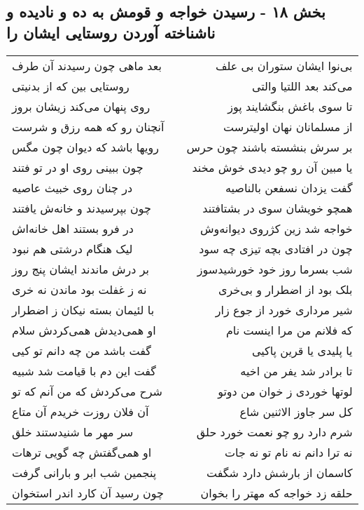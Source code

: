 \begin{center}
\section*{بخش ۱۸ - رسیدن خواجه و قومش به ده و نادیده و ناشناخته آوردن روستایی ایشان را}
\label{sec:sh018}
\begin{longtable}{l p{0.5cm} r}
بعد ماهی چون رسیدند آن طرف
&&
بی‌نوا ایشان ستوران بی علف
\\
روستایی بین که از بدنیتی
&&
می‌کند بعد اللتیا والتی
\\
روی پنهان می‌کند زیشان بروز
&&
تا سوی باغش بنگشایند پوز
\\
آنچنان رو که همه رزق و شرست
&&
از مسلمانان نهان اولیترست
\\
رویها باشد که دیوان چون مگس
&&
بر سرش بنشسته باشند چون حرس
\\
چون ببینی روی او در تو فتند
&&
یا مبین آن رو چو دیدی خوش مخند
\\
در چنان روی خبیث عاصیه
&&
گفت یزدان نسفعن بالناصیه
\\
چون بپرسیدند و خانه‌ش یافتند
&&
همچو خویشان سوی در بشتافتند
\\
در فرو بستند اهل خانه‌اش
&&
خواجه شد زین کژروی دیوانه‌وش
\\
لیک هنگام درشتی هم نبود
&&
چون در افتادی بچه تیزی چه سود
\\
بر درش ماندند ایشان پنج روز
&&
شب بسرما روز خود خورشیدسوز
\\
نه ز غفلت بود ماندن نه خری
&&
بلک بود از اضطرار و بی‌خری
\\
با لئیمان بسته نیکان ز اضطرار
&&
شیر مرداری خورد از جوع زار
\\
او همی‌دیدش همی‌کردش سلام
&&
که فلانم من مرا اینست نام
\\
گفت باشد من چه دانم تو کیی
&&
یا پلیدی یا قرین پاکیی
\\
گفت این دم با قیامت شد شبیه
&&
تا برادر شد یفر من اخیه
\\
شرح می‌کردش که من آنم که تو
&&
لوتها خوردی ز خوان من دوتو
\\
آن فلان روزت خریدم آن متاع
&&
کل سر جاوز الاثنین شاع
\\
سر مهر ما شنیدستند خلق
&&
شرم دارد رو چو نعمت خورد حلق
\\
او همی‌گفتش چه گویی ترهات
&&
نه ترا دانم نه نام تو نه جات
\\
پنجمین شب ابر و بارانی گرفت
&&
کاسمان از بارشش دارد شگفت
\\
چون رسید آن کارد اندر استخوان
&&
حلقه زد خواجه که مهتر را بخوان
\\

\end{longtable}
\end{center}
